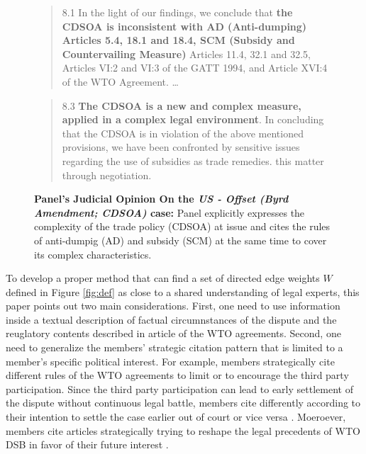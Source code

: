 \begin{figure}[h]
    \begin{quote}
        8.1 In the light of our findings, we conclude that \textbf{the CDSOA is inconsistent with AD (Anti-dumping)
        Articles 5.4, 18.1 and 18.4, SCM (Subsidy and Countervailing Measure)} Articles 11.4, 32.1 and 32.5, Articles VI:2 and VI:3 of the GATT
        1994, and Article XVI:4 of the WTO Agreement. \ldots
    \end{quote} 
    \begin{quote}
        8.3 \textbf{The CDSOA is a new and complex measure, applied in a complex legal environment}. In
        concluding that the CDSOA is in violation of the above mentioned provisions, we have been
        confronted by sensitive issues regarding the use of subsidies as trade remedies.
        this matter through negotiation.
    \end{quote} 
    \caption{\textbf{Panel's Judicial Opinion On the \textit{US - Offset (Byrd Amendment; CDSOA)} case:} Panel explicitly expresses the complexity of the trade policy (CDSOA) at issue and cites the rules of anti-dumpig (AD) and subsidy (SCM) at the same time to cover its complex characteristics.}
    \label{fig:complex-measure}
\end{figure}

To develop a proper method that can find a set of directed edge weights $W$ defined in Figure \ref{fig:def}
as close to a shared understanding of legal experts, this paper points out two main considerations. 
First, one need to use information inside a textual description of factual circumnstances of the dispute and the reuglatory contents described in article of the WTO agreements.
Second, one need to generalize the members' strategic citation pattern that is limited to a member's specific political interest.
For example, members strategically cite different rules of the WTO agreements to limit or to encourage
the third party participation. Since the third party participation
can lead to early settlement of the dispute without continuous
legal battle, members cite differently according to their intention to
settle the case earlier out of court or vice versa \citep{who_gets}. Moeroever, members cite articles strategically trying to reshape the legal precedents of WTO DSB
in favor of their future interest \citep{pelc, latent}. 

